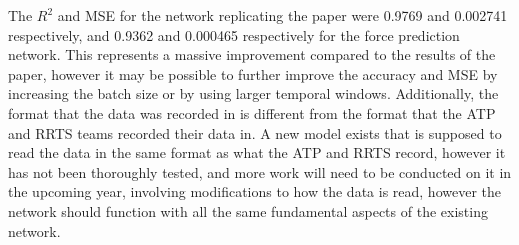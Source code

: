 The $R^2$ and MSE for the network replicating the paper were 0.9769 and 0.002741 respectively, and 0.9362 and 0.000465 respectively for the force prediction network. This represents a massive improvement compared to the results of the paper, however it may be possible to further improve the accuracy and MSE by increasing the batch size or by using larger temporal windows. Additionally, the format that the data was recorded in is different from the format that the ATP and RRTS teams recorded their data in. A new model exists that is supposed to read the data in the same format as what the ATP and RRTS record, however it has not been thoroughly tested, and more work will need to be conducted on it in the upcoming year, involving modifications to how the data is read, however the network should function with all the same fundamental aspects of the existing network.
 
